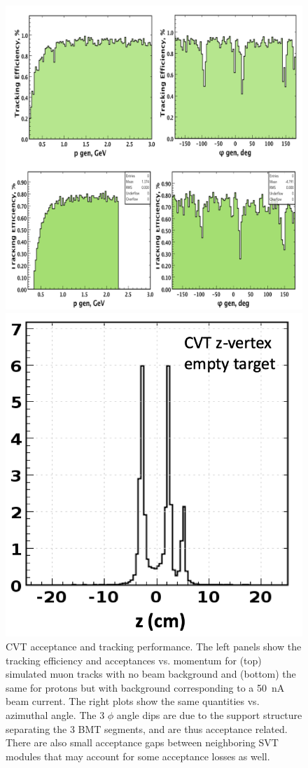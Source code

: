 \documentclass[final,3p]{elsarticle}
\begin{document}
\begin{twocolumn}
\begin{figure}[t!]
\centerline{\includegraphics[width=1.0\columnwidth]{cvt-acceptance.png}}
\caption{CVT acceptance and tracking performance. The left panels show the tracking efficiency and acceptances vs.
  momentum for (top) simulated muon tracks with no beam background and (bottom) the same for protons but with
  background corresponding to a 50~nA beam current. The right plots show the same quantities vs. azimuthal angle. The
  3 $\phi$ angle dips are due to the support structure separating the 3 BMT segments, and are thus acceptance related.
  There are also small acceptance gaps between neighboring SVT modules that may account for some acceptance losses
  as well.}
\label{cvt-acceptance}
\vspace{0.3cm}
\centerline{\includegraphics[width=0.8\columnwidth]{cvt-vertex.png}}

\end{figure}
\end{twocolumn}
\end{document}
